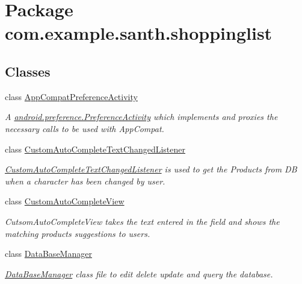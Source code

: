 \hypertarget{namespacecom_1_1example_1_1santh_1_1shoppinglist}{}\section{Package com.\+example.\+santh.\+shoppinglist}
\label{namespacecom_1_1example_1_1santh_1_1shoppinglist}
\subsection*{Classes}
\begin{DoxyCompactItemize}
\item 
class \hyperlink{classcom_1_1example_1_1santh_1_1shoppinglist_1_1_app_compat_preference_activity}{App\+Compat\+Preference\+Activity}
\begin{DoxyCompactList}\small\item\em A \hyperlink{}{android.\+preference.\+Preference\+Activity} which implements and proxies the necessary calls to be used with App\+Compat. \end{DoxyCompactList}\item 
class \hyperlink{classcom_1_1example_1_1santh_1_1shoppinglist_1_1_custom_auto_complete_text_changed_listener}{Custom\+Auto\+Complete\+Text\+Changed\+Listener}
\begin{DoxyCompactList}\small\item\em \hyperlink{classcom_1_1example_1_1santh_1_1shoppinglist_1_1_custom_auto_complete_text_changed_listener}{Custom\+Auto\+Complete\+Text\+Changed\+Listener} is used to get the Products from DB when a character has been changed by user. \end{DoxyCompactList}\item 
class \hyperlink{classcom_1_1example_1_1santh_1_1shoppinglist_1_1_custom_auto_complete_view}{Custom\+Auto\+Complete\+View}
\begin{DoxyCompactList}\small\item\em Cutsom\+Auto\+Complete\+View takes the text entered in the field and shows the matching products suggestions to users. \end{DoxyCompactList}\item 
class \hyperlink{classcom_1_1example_1_1santh_1_1shoppinglist_1_1_data_base_manager}{Data\+Base\+Manager}
\begin{DoxyCompactList}\small\item\em \hyperlink{classcom_1_1example_1_1santh_1_1shoppinglist_1_1_data_base_manager}{Data\+Base\+Manager} class file to edit delete update and query the database. \end{DoxyCompactList}\item 

\end{DoxyCompactItemize}
